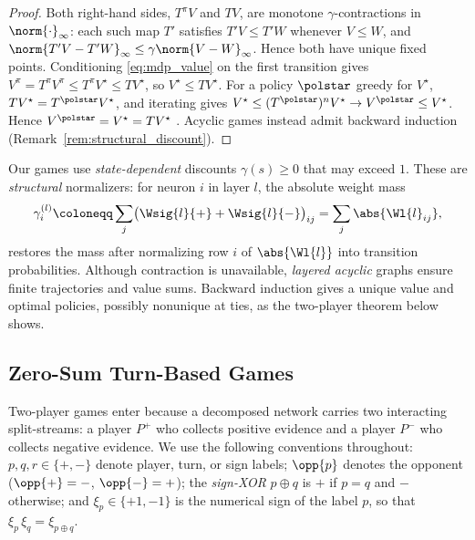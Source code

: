 \begin{proof}
Both right-hand sides, $T^{\pi}V$ and $TV$, are monotone $\gamma$-contractions in $\norm{\cdot}_\infty$: each such map $T'$ satisfies $T'V\le T'W$ whenever $V\le W$, and $\norm{T'V-T'W}_\infty\le\gamma\norm{V-W}_\infty$. Hence both have unique fixed points. Conditioning \eqref{eq:mdp_value} on the first transition gives $V^{\pi}=T^{\pi}V^{\pi}\le T^{\pi}V^{\star}\le TV^{\star}$, so $V^{\star}\le TV^{\star}$. For a policy $\polstar$ greedy for $V^{\star}$, $TV^{\star}=T^{\polstar}V^{\star}$, and iterating gives $V^{\star}\le(T^{\polstar})^nV^{\star}\to V^{\polstar}\le V^{\star}$. Hence $V^{\polstar}=V^{\star}=TV^{\star}$ \parencite{Puterman1994mdp,SuttonBarto2018rl}. Acyclic games instead admit backward induction (Remark~\ref{rem:structural_discount}).
\end{proof}

\begin{remark}\label{rem:structural_discount}
Our games use \emph{state-dependent} discounts $\gamma(s)\ge0$ that may exceed $1$. These are \emph{structural} normalizers: for neuron $i$ in layer $l$, the absolute weight mass
\begin{equation}
	\gamma^{(l)}_i \coloneqq \sum_{j} \bigl( \Wsig{l}{+} + \Wsig{l}{-} \bigr)_{ij} = \sum_j \abs{\Wl{l}_{ij}},
	\label{eq:structural_discount}
\end{equation}
restores the mass after normalizing row $i$ of $\abs{\Wl{l}}$ into transition probabilities. Although contraction is unavailable, \emph{layered acyclic} graphs ensure finite trajectories and value sums. Backward induction gives a unique value and optimal policies, possibly nonunique at ties, as the two-player theorem below shows.
\end{remark}

\subsection{Zero-Sum Turn-Based Games}

Two-player games enter because a decomposed network carries two interacting split-streams: a player $P^{+}$ who collects positive evidence and a player $P^{-}$ who collects negative evidence. We use the following conventions throughout: $p, q, r \in \{+, -\}$ denote player, turn, or sign labels; $\opp{p}$ denotes the opponent ($\opp{+} = -$, $\opp{-} = +$); the \emph{sign-XOR} $p \oplus q$ is $+$ if $p = q$ and $-$ otherwise; and $\xi_{p} \in \{+1, -1\}$ is the numerical sign of the label $p$, so that $\xi_{p}\, \xi_{q} = \xi_{p \oplus q}$.

